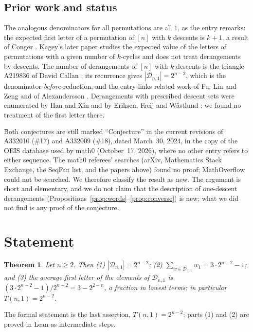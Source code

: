 \documentclass[11pt]{amsart}
\theoremstyle{plain}
\newtheorem{theorem}{Theorem}
\theoremstyle{definition}
\newcommand{\cD}{\mathcal{D}}
\begin{document}
\subsection*{Prior work and status}
The analogous denominators for all permutations are all $1$, as the entry remarks: the expected first letter of a permutation of $[n]$ with $k$ descents is $k+1$, a result of Conger \cite{Conger}. Kagey's later paper \cite{Kagey} studies the expected value of the letters of permutations with a given number of $k$-cycles and does not treat derangements by descents. The number of derangements of $[n]$ with $k$ descents is the triangle A219836 of David Callan \cite{A219836}; its recurrence gives $|\cD_{n,1}|=2^{n-2}$, which is the denominator \emph{before} reduction, and the entry links related work of Fu, Lin and Zeng \cite{FLZ} and of Alexandersson \cite{Alexandersson}. Derangements with prescribed descent sets were enumerated by Han and Xin \cite{HanXin} and by Eriksen, Freij and W\"astlund \cite{EFW}; we found no treatment of the first letter there.

Both conjectures are still marked ``Conjecture'' in the current revisions of A332010 (\#17) and A332009 (\#18), dated March~30, 2024, in the copy of the OEIS database used by math0 (October~17, 2026), where no other entry refers to either sequence. The math0 referees' searches (arXiv, Mathematics Stack Exchange, the SeqFan list, and the papers above) found no proof; MathOverflow could not be searched. We therefore classify the result as new. The argument is short and elementary, and we do not claim that the description of one-descent derangements (Propositions~\ref{prop:words}--\ref{prop:converse}) is new; what we did not find is any proof of the conjecture.

\section{Statement}\label{sec:statement}

\begin{theorem}\label{thm:main}
Let $n\ge2$. Then \textup{(1)} $|\cD_{n,1}|=2^{n-2}$; \textup{(2)} $\sum_{w\in\cD_{n,1}}w_1=3\cdot2^{n-2}-1$; and \textup{(3)} the average first letter of the elements of $\cD_{n,1}$ is $(3\cdot2^{n-2}-1)/2^{n-2}=3-2^{2-n}$, a fraction in lowest terms; in particular $T(n,1)=2^{n-2}$.
\end{theorem}

The formal statement is the last assertion, $T(n,1)=2^{n-2}$; parts (1) and (2) are proved in Lean as intermediate steps.
\end{document}
